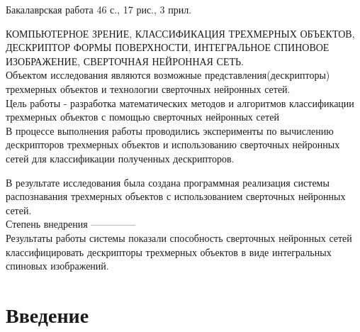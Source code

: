 \documentclass[14pt]{article}
\numberwithin{figure}{section}
\numberwithin{equation}{section}
\begin{document}
\begin{flushleft}
Бакалаврская работа 46 с., 17 рис., 3 прил.                                       \\
\vspace{0.5cm}

КОМПЬЮТЕРНОЕ ЗРЕНИЕ, КЛАССИФИКАЦИЯ ТРЕХМЕРНЫХ ОБЪЕКТОВ, ДЕСКРИПТОР ФОРМЫ ПОВЕРХНОСТИ, ИНТЕГРАЛЬНОЕ СПИНОВОЕ ИЗОБРАЖЕНИЕ, СВЕРТОЧНАЯ НЕЙРОННАЯ СЕТЬ.                     \\

\vspace{0.5cm}
Объектом исследования являются возможные представления(дескрипторы) трехмерных объектов и технологии сверточных нейронных сетей.                                            \\
\vspace{0.5cm}
Цель работы - разработка математических методов и алгоритмов классификации трехмерных объектов с помощью сверточных нейронных сетей                                     \\
\vspace{0.5cm}
В процессе выполнения работы проводились эксперименты по вычислению дескрипторов трехмерных объектов и использованию сверточных нейронных сетей для классификации полученных дескрипторов.                                                          \\
\vspace{0.5cm}

В результате исследования была создана программная реализация системы распознавания трехмерных объектов с использованием сверточных нейронных сетей.                  \\
\vspace{0.5cm}
Степень внедрения --------------                                                  \\
\vspace{0.5cm}
Результаты работы системы показали способность сверточных нейронных сетей классифицировать дескрипторы трехмерных объектов в виде интегральных спиновых изображений.
\end{flushleft}

{}


\tableofcontents

\newpage

\section*{Введение}
\end{document}
